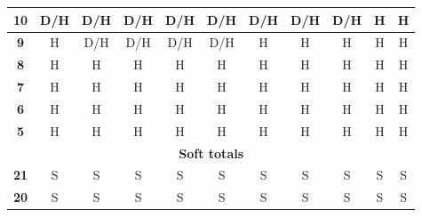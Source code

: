 \documentclass[conference]{IEEEtran}
\begin{document}
\begin{table}[htbp]
\begin{tabular}{|c|c|c|c|c|c|c|c|c|c|c|}
\textbf{10} & \cellcolor[HTML]{FFC702}D/H & \cellcolor[HTML]{FFC702}D/H & \cellcolor[HTML]{FFC702}D/H & \cellcolor[HTML]{FFC702}D/H & \cellcolor[HTML]{FFC702}D/H & \cellcolor[HTML]{FFC702}D/H & \cellcolor[HTML]{FFC702}D/H & \cellcolor[HTML]{FFC702}D/H & \cellcolor[HTML]{FE0000}H & \cellcolor[HTML]{FE0000}H \\ \hline
\textbf{9} & \cellcolor[HTML]{FE0000}H & \cellcolor[HTML]{FFC702}D/H & \cellcolor[HTML]{FFC702}D/H & \cellcolor[HTML]{FFC702}D/H & \cellcolor[HTML]{FFC702}D/H & \cellcolor[HTML]{FE0000}H & \cellcolor[HTML]{FE0000}H & \cellcolor[HTML]{FE0000}H & \cellcolor[HTML]{FE0000}H & \cellcolor[HTML]{FE0000}H \\ \hline
\textbf{8} & \cellcolor[HTML]{FE0000}H & \cellcolor[HTML]{FE0000}H & \cellcolor[HTML]{FE0000}H & \cellcolor[HTML]{FE0000}H & \cellcolor[HTML]{FE0000}H & \cellcolor[HTML]{FE0000}H & \cellcolor[HTML]{FE0000}H & \cellcolor[HTML]{FE0000}H & \cellcolor[HTML]{FE0000}H & \cellcolor[HTML]{FE0000}H \\ \hline
\textbf{7} & \cellcolor[HTML]{FE0000}H & \cellcolor[HTML]{FE0000}H & \cellcolor[HTML]{FE0000}H & \cellcolor[HTML]{FE0000}H & \cellcolor[HTML]{FE0000}H & \cellcolor[HTML]{FE0000}H & \cellcolor[HTML]{FE0000}H & \cellcolor[HTML]{FE0000}H & \cellcolor[HTML]{FE0000}H & \cellcolor[HTML]{FE0000}H \\ \hline
\textbf{6} & \cellcolor[HTML]{FE0000}H & \cellcolor[HTML]{FE0000}H & \cellcolor[HTML]{FE0000}H & \cellcolor[HTML]{FE0000}H & \cellcolor[HTML]{FE0000}H & \cellcolor[HTML]{FE0000}H & \cellcolor[HTML]{FE0000}H & \cellcolor[HTML]{FE0000}H & \cellcolor[HTML]{FE0000}H & \cellcolor[HTML]{FE0000}H \\ \hline
\textbf{5} & \cellcolor[HTML]{FE0000}H & \cellcolor[HTML]{FE0000}H & \cellcolor[HTML]{FE0000}H & \cellcolor[HTML]{FE0000}H & \cellcolor[HTML]{FE0000}H & \cellcolor[HTML]{FE0000}H & \cellcolor[HTML]{FE0000}H & \cellcolor[HTML]{FE0000}H & \cellcolor[HTML]{FE0000}H & \cellcolor[HTML]{FE0000}H \\ \hline
\multicolumn{11}{|c|}{\textbf{Soft totals}} \\ \hline
\textbf{21} & \cellcolor[HTML]{32CB00}S & \cellcolor[HTML]{32CB00}S & \cellcolor[HTML]{32CB00}S & \cellcolor[HTML]{32CB00}S & \cellcolor[HTML]{32CB00}S & \cellcolor[HTML]{32CB00}S & \cellcolor[HTML]{32CB00}S & \cellcolor[HTML]{32CB00}S & \cellcolor[HTML]{32CB00}S & \cellcolor[HTML]{32CB00}S \\ \hline
\textbf{20} & \cellcolor[HTML]{32CB00}S & \cellcolor[HTML]{32CB00}S & \cellcolor[HTML]{32CB00}S & \cellcolor[HTML]{32CB00}S & \cellcolor[HTML]{32CB00}S & \cellcolor[HTML]{32CB00}S & \cellcolor[HTML]{32CB00}S & \cellcolor[HTML]{32CB00}S & \cellcolor[HTML]{32CB00}S & \cellcolor[HTML]{32CB00}S \\ \hline

\end{tabular}
\end{table}
\end{document}
